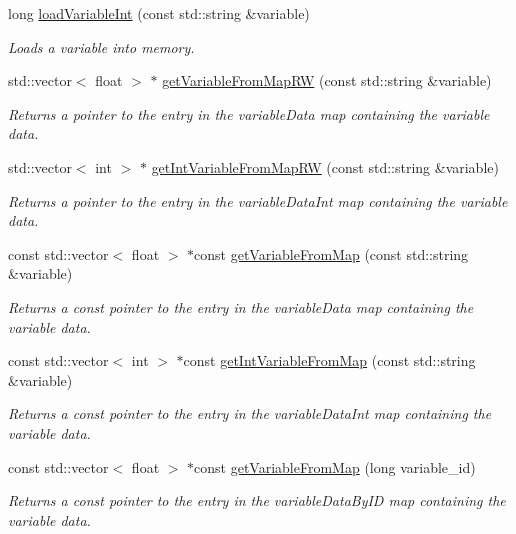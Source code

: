 \begin{DoxyCompactItemize}
long \hyperlink{classccmc_1_1_model_a05c373d53a6bdb5b3f9663e129fb35c1}{load\-Variable\-Int} (const std\-::string \&variable)
\begin{DoxyCompactList}\small\item\em Loads a variable into memory. \end{DoxyCompactList}\item 
std\-::vector$<$ float $>$ $\ast$ \hyperlink{classccmc_1_1_model_a455cb13509b48380741fbcc84ccec405}{get\-Variable\-From\-Map\-R\-W} (const std\-::string \&variable)
\begin{DoxyCompactList}\small\item\em Returns a pointer to the entry in the variable\-Data map containing the variable data. \end{DoxyCompactList}\item 
std\-::vector$<$ int $>$ $\ast$ \hyperlink{classccmc_1_1_model_a9d18c0f94f6731926399c1a93b429298}{get\-Int\-Variable\-From\-Map\-R\-W} (const std\-::string \&variable)
\begin{DoxyCompactList}\small\item\em Returns a pointer to the entry in the variable\-Data\-Int map containing the variable data. \end{DoxyCompactList}\item 
const std\-::vector$<$ float $>$ $\ast$const \hyperlink{classccmc_1_1_model_a6c18b6296eaf1455866c860aeba694ee}{get\-Variable\-From\-Map} (const std\-::string \&variable)
\begin{DoxyCompactList}\small\item\em Returns a const pointer to the entry in the variable\-Data map containing the variable data. \end{DoxyCompactList}\item 
const std\-::vector$<$ int $>$ $\ast$const \hyperlink{classccmc_1_1_model_a508098e881d48a4a9e878bd7f859d8e5}{get\-Int\-Variable\-From\-Map} (const std\-::string \&variable)
\begin{DoxyCompactList}\small\item\em Returns a const pointer to the entry in the variable\-Data\-Int map containing the variable data. \end{DoxyCompactList}\item 
const std\-::vector$<$ float $>$ $\ast$const \hyperlink{classccmc_1_1_model_adfc74a4905762247f2ee5b6a74d1d107}{get\-Variable\-From\-Map} (long variable\-\_\-id)
\begin{DoxyCompactList}\small\item\em Returns a const pointer to the entry in the variable\-Data\-By\-I\-D map containing the variable data. \end{DoxyCompactList}\item 

\end{DoxyCompactItemize}
